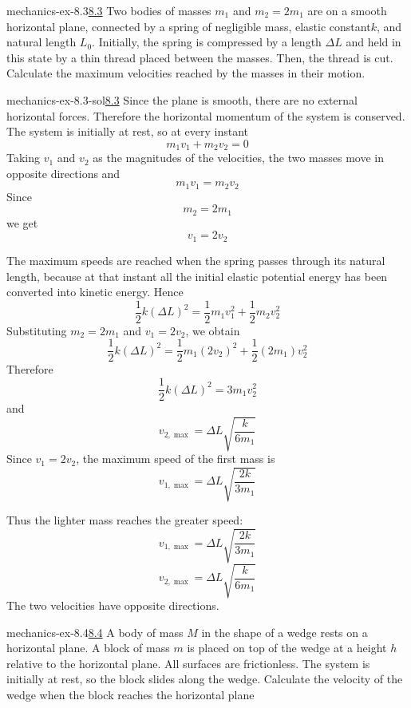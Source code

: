 \documentclass[preview]{standalone}
\begin{document}
\begin{snippetexercise}{mechanics-ex-8.3}{\underline{8.3}}
    Two bodies of masses \(m_1\) and \(m_2 = 2m_1\) are on a smooth horizontal plane,
    connected by a spring of negligible mass, elastic constant\(k\), and natural length \(L_0\).
    Initially, the spring is compressed by a length \(\Delta L\) and held in this state by a thin thread
    placed between the masses. Then, the thread is cut.
    Calculate the maximum velocities reached by the masses in their motion.
\end{snippetexercise}

\begin{snippetsolution}{mechanics-ex-8.3-sol}{\underline{8.3}}
    Since the plane is smooth, there are no external horizontal forces. Therefore
    the horizontal momentum of the system is conserved. The system is initially at
    rest, so at every instant
    \[
        m_1v_1 + m_2v_2 = 0
    \]
    Taking \(v_1\) and \(v_2\) as the magnitudes of the velocities, the two masses
    move in opposite directions and
    \[
        m_1v_1 = m_2v_2
    \]
    Since
    \[
        m_2 = 2m_1
    \]
    we get
    \[
        v_1 = 2v_2
    \]

    The maximum speeds are reached when the spring passes through its natural
    length, because at that instant all the initial elastic potential energy has
    been converted into kinetic energy. Hence
    \[
        \frac{1}{2}k(\Delta L)^2
        =
        \frac{1}{2}m_1v_1^2
        +
        \frac{1}{2}m_2v_2^2
    \]
    Substituting \(m_2=2m_1\) and \(v_1=2v_2\), we obtain
    \[
        \frac{1}{2}k(\Delta L)^2
        =
        \frac{1}{2}m_1(2v_2)^2
        +
        \frac{1}{2}(2m_1)v_2^2
    \]
    Therefore
    \[
        \frac{1}{2}k(\Delta L)^2
        =
        3m_1v_2^2
    \]
    and
    \[
        v_{2,\max}
        =
        \Delta L\sqrt{\frac{k}{6m_1}}
    \]
    Since \(v_1=2v_2\), the maximum speed of the first mass is
    \[
        v_{1,\max}
        =
        \Delta L\sqrt{\frac{2k}{3m_1}}
    \]

    Thus the lighter mass reaches the greater speed:
    \[
        v_{1,\max}
        =
        \Delta L\sqrt{\frac{2k}{3m_1}}
    \]
    \[
        v_{2,\max}
        =
        \Delta L\sqrt{\frac{k}{6m_1}}
    \]
    The two velocities have opposite directions.
\end{snippetsolution}

\begin{snippetexercise}{mechanics-ex-8.4}{\underline{8.4}}
    A body of mass \(M\) in the shape of a wedge rests on a horizontal plane.
    A block of mass \(m\) is placed on top of the wedge at a height \(h\) relative to the horizontal plane.
    All surfaces are frictionless.
    The system is initially at rest, so the block slides along the wedge.
    Calculate the velocity of the wedge when the block reaches the horizontal plane
\end{snippetexercise}
\end{document}
